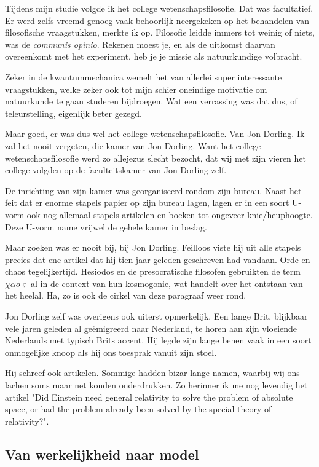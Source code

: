 \documentclass{article}      %
\begin{document}
Tijdens mijn studie volgde ik het college wetenschapsfilosofie. Dat was 
facultatief. Er werd zelfs vreemd genoeg vaak behoorlijk neergekeken op
het behandelen van filosofische vraagstukken, merkte ik op. Filosofie leidde
immers tot weinig of niets, was de {\it communis opinio}. 
Rekenen moest je, en als de uitkomst daarvan overeenkomt met het experiment, 
heb je je missie als natuurkundige volbracht.

Zeker in de kwantummechanica wemelt het van allerlei super interessante 
vraagstukken, welke zeker ook tot mijn schier oneindige motivatie om natuurkunde
te gaan studeren bijdroegen. Wat een verrassing was dat dus, of teleurstelling, 
eigenlijk beter gezegd.

Maar goed, er was dus wel het college wetenschapsfilosofie. Van Jon Dorling. 
Ik zal het nooit vergeten, die kamer van Jon Dorling. Want het college 
wetenschapsfilosofie werd zo allejezus slecht bezocht, dat wij met zijn vieren
het college volgden op de faculteitskamer van Jon Dorling zelf.

De inrichting van zijn kamer was georganiseerd rondom zijn bureau. Naast het 
feit dat er enorme stapels papier op zijn bureau lagen, lagen er in een 
soort U-vorm ook nog allemaal stapels artikelen en boeken tot ongeveer 
knie/heuphoogte. Deze U-vorm name vrijwel de gehele kamer in beslag.

Maar zoeken was er nooit bij, bij Jon Dorling. Feilloos viste hij uit 
alle stapels precies dat ene artikel dat hij tien jaar geleden geschreven
had vandaan. Orde en chaos tegelijkertijd. Hesiodos en de presocratische 
filosofen gebruikten de term $\chi\alpha o\varsigma$
al in de context van hun kosmogonie, wat handelt over het ontstaan van het heelal. 
Ha, zo is ook de cirkel van deze paragraaf weer rond.

Jon Dorling zelf was overigens ook uiterst opmerkelijk. Een lange Brit, 
blijkbaar vele jaren geleden al ge\"emigreerd naar Nederland, te horen aan  
zijn vloeiende Nederlands met typisch Brits accent. Hij legde zijn lange benen 
vaak in een soort onmogelijke knoop als hij ons toesprak vanuit zijn stoel. 

Hij schreef ook artikelen. Sommige hadden bizar lange namen, waarbij wij ons 
lachen soms maar net konden onderdrukken. Zo herinner ik me nog levendig het 
artikel "Did Einstein need general relativity to solve the problem of 
absolute space, or had the problem already been solved by the special theory 
of relativity?".

\subsection{Van werkelijkheid naar model}
\end{document}
